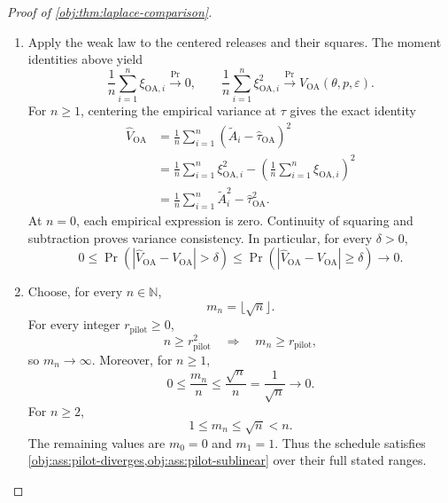 \documentclass[11pt]{article}
\begin{document}
\begin{proof}[Proof of \cref{obj:thm:laplace-comparison}]
\begin{enumerate}
For every positive integer \(n\), factoring out \(\sqrt n\) from both square roots and canceling the positive common factor \(z_{1-\gamma/2}/\sqrt n\) gives
\[
\begin{aligned}
\frac{z_{1-\gamma/2}\sqrt{V_{\mathrm{OA}}(\theta,p,\varepsilon)/n}}
     {z_{1-\gamma/2}\sqrt{V^*(\theta,p,\varepsilon)/n}}
&=
\frac{\sqrt{V_{\mathrm{OA}}(\theta,p,\varepsilon)}}
     {\sqrt{V^*(\theta,p,\varepsilon)}}\\
&=
\sqrt{\frac{V_{\mathrm{OA}}(\theta,p,\varepsilon)}
           {V^*(\theta,p,\varepsilon)}}.
\end{aligned}
\]
The identities also respect the zero-reciprocal convention. The sequence is consequently equal to its claimed limit for every \(n\ge1\).

\item Apply the weak law to the centered releases and their squares. The moment identities above yield
\[
\frac1n\sum_{i=1}^n\xi_{\mathrm{OA},i}
\xrightarrow{\Pr}0,
\qquad
\frac1n\sum_{i=1}^n\xi_{\mathrm{OA},i}^2
\xrightarrow{\Pr}V_{\mathrm{OA}}(\theta,p,\varepsilon).
\]
For \(n\ge1\), centering the empirical variance at \(\tau\) gives the exact identity
\[
\begin{aligned}
\widehat V_{\mathrm{OA}}
&=
\frac1n\sum_{i=1}^n
(\widetilde A_i-\widehat\tau_{\mathrm{OA}})^2\\
&=
\frac1n\sum_{i=1}^n\xi_{\mathrm{OA},i}^2
-
\left(\frac1n\sum_{i=1}^n\xi_{\mathrm{OA},i}\right)^2\\
&=
\frac1n\sum_{i=1}^n\widetilde A_i^2
-\widehat\tau_{\mathrm{OA}}^2.
\end{aligned}
\]
At \(n=0\), each empirical expression is zero. Continuity of squaring and subtraction proves variance consistency. In particular, for every \(\delta>0\),
\[
0\le
\Pr\!\left(
|\widehat V_{\mathrm{OA}}-V_{\mathrm{OA}}|>\delta
\right)
\le
\Pr\!\left(
|\widehat V_{\mathrm{OA}}-V_{\mathrm{OA}}|\ge\delta
\right)
\longrightarrow0.
\]

\item Choose, for every \(n\in\mathbb N\),
\[
m_n=\lfloor\sqrt n\rfloor.
\]
For every integer \(r_{\mathrm{pilot}}\ge0\),
\[
n\ge r_{\mathrm{pilot}}^2
\quad\Longrightarrow\quad
m_n\ge r_{\mathrm{pilot}},
\]
so \(m_n\to\infty\). Moreover, for \(n\ge1\),
\[
0\le\frac{m_n}{n}
\le\frac{\sqrt n}{n}
=\frac1{\sqrt n}\longrightarrow0.
\]
For \(n\ge2\),
\[
1\le m_n\le\sqrt n<n.
\]
The remaining values are \(m_0=0\) and \(m_1=1\). Thus the schedule satisfies
\cref{obj:ass:pilot-diverges,obj:ass:pilot-sublinear} over their full stated ranges.


\end{enumerate}
\end{proof}
\end{document}
